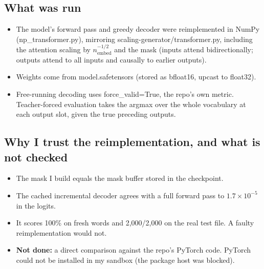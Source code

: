 \documentclass[paper=a4,fontsize=11pt,DIV=11,parskip=half,headings=small,numbers=noendperiod]{scrartcl}
\DeclareRobustCommand{\lead}[1]{\textsf{\bfseries\color{accent}#1}}
\DeclareRobustCommand{\code}[1]{{\fontseries{m}\ttfamily #1}}
\begin{document}
\subsection{What was run}\label{sec:2.1}
\begin{itemize}
\item The model’s forward pass and greedy decoder were reimplemented in NumPy
  (\code{np\_\allowbreak{}transformer.\allowbreak{}py}), mirroring
  \code{scaling-\allowbreak{}generator/\allowbreak{}transformer.\allowbreak{}py}, including the attention
  scaling by $n_{\text{embed}}^{-1/2}$ and the mask (inputs attend bidirectionally; outputs attend to all inputs
  and causally to earlier outputs).
\item Weights come from \code{model.\allowbreak{}safetensors} (stored as bfloat16, upcast to float32).
\item Free-running decoding uses \code{force\_\allowbreak{}valid=\allowbreak{}True}, the repo’s own metric.
  Teacher-forced evaluation takes the argmax over the whole vocabulary at each output slot, given the true
  preceding outputs.
\end{itemize}

\subsection{Why I trust the reimplementation, and what is not checked}\label{sec:2.2}
\begin{itemize}
\item The mask I build equals the mask buffer stored in the checkpoint.
\item The cached incremental decoder agrees with a full forward pass to $1.7\times10^{-5}$ in the logits.
\item It scores 100\% on fresh words and 2,000/2,000 on the real test file. A faulty reimplementation would not.
\item \lead{Not done:} a direct comparison against the repo’s PyTorch code. PyTorch could not be installed in my
  sandbox (the package host was blocked).
\end{itemize}
\end{document}
